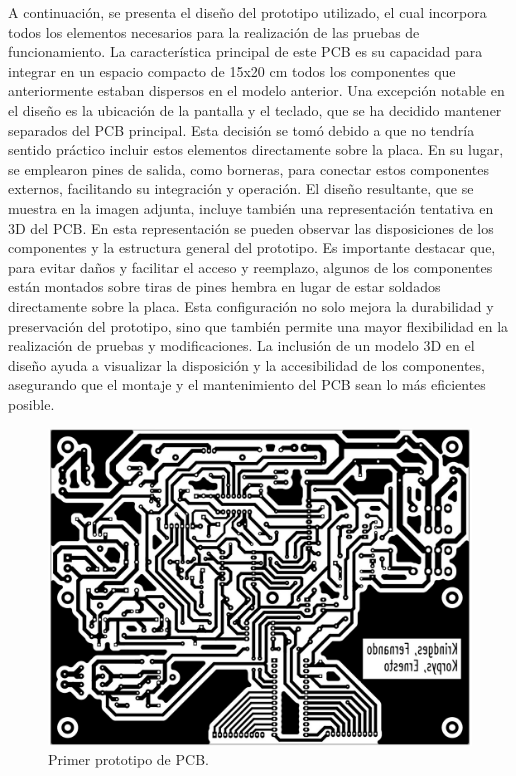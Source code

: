 A continuación, se presenta el diseño del prototipo utilizado, el cual incorpora todos los elementos necesarios para la realización de las pruebas de funcionamiento. La característica principal de este PCB es su capacidad para integrar en un espacio compacto de 15x20 cm todos los componentes que anteriormente estaban dispersos en el modelo anterior.
Una excepción notable en el diseño es la ubicación de la pantalla y el teclado, que se ha decidido mantener separados del PCB principal. Esta decisión se tomó debido a que no tendría sentido práctico incluir estos elementos directamente sobre la placa. En su lugar, se emplearon pines de salida, como borneras, para conectar estos componentes externos, facilitando su integración y operación.
El diseño resultante, que se muestra en la imagen adjunta, incluye también una representación tentativa en 3D del PCB. En esta representación se pueden observar las disposiciones de los componentes y la estructura general del prototipo. Es importante destacar que, para evitar daños y facilitar el acceso y reemplazo, algunos de los componentes están montados sobre tiras de pines hembra en lugar de estar soldados directamente sobre la placa. Esta configuración no solo mejora la durabilidad y preservación del prototipo, sino que también permite una mayor flexibilidad en la realización de pruebas y modificaciones. La inclusión de un modelo 3D en el diseño ayuda a visualizar la disposición y la accesibilidad de los componentes, asegurando que el montaje y el mantenimiento del PCB sean lo más eficientes posible.
\begin{figure}[H]
    \centering
    \includegraphics[scale=0.5]{./imagenes/pcb_v1.jpg}
    \caption{Primer prototipo de PCB.}
    \label{F:PCB_V1}
\end{figure}
